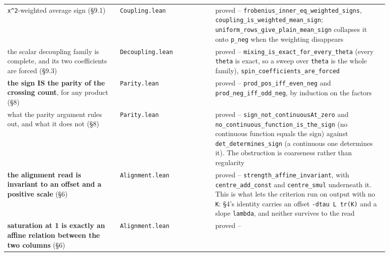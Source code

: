 \documentclass[10pt,letterpaper,twocolumn]{article}
\begin{document}
\begin{center}
{\begin{xtabular}{L{0.264\linewidth}L{0.228\linewidth}L{0.405\linewidth}}
\texttt{\textbar{}\allowbreak{}x\textbar{}\allowbreak{}\^{}2}-weighted
average sign (§9.1) & \texttt{Coupling.\allowbreak{}lean} & proved --
\texttt{frobenius\_\allowbreak{}inner\_\allowbreak{}eq\_\allowbreak{}weighted\_\allowbreak{}signs},
\texttt{coupling\_\allowbreak{}is\_\allowbreak{}weighted\_\allowbreak{}mean\_\allowbreak{}sign};
\texttt{uniform\_\allowbreak{}rows\_\allowbreak{}give\_\allowbreak{}plain\_\allowbreak{}mean\_\allowbreak{}sign}
collapses it onto \texttt{p\_\allowbreak{}neg} when the weighting
disappears \\
the scalar decoupling family is complete, and its two coefficients are
forced (§9.3) & \texttt{Decoupling.\allowbreak{}lean} & proved --
\texttt{mixing\_\allowbreak{}is\_\allowbreak{}exact\_\allowbreak{}for\_\allowbreak{}every\_\allowbreak{}theta}
(every \texttt{theta} is exact, so a sweep over \texttt{theta} is the
whole family),
\texttt{spin\_\allowbreak{}coefficients\_\allowbreak{}are\_\allowbreak{}forced} \\
\textbf{the sign IS the parity of the crossing count}, for any product
(§8) & \texttt{Parity.\allowbreak{}lean} & proved --
\texttt{prod\_\allowbreak{}pos\_\allowbreak{}iff\_\allowbreak{}even\_\allowbreak{}neg}
and
\texttt{prod\_\allowbreak{}neg\_\allowbreak{}iff\_\allowbreak{}odd\_\allowbreak{}neg},
by induction on the factors \\
what the parity argument rules out, and what it does not (§8) & \texttt{Parity.\allowbreak{}lean} & proved --
\texttt{sign\_\allowbreak{}not\_\allowbreak{}continuousAt\_\allowbreak{}zero}
and
\texttt{no\_\allowbreak{}continuous\_\allowbreak{}function\_\allowbreak{}is\_\allowbreak{}the\_\allowbreak{}sign}
(no continuous function equals the sign) against
\texttt{det\_\allowbreak{}determines\_\allowbreak{}sign} (a continuous
one determines it). The obstruction is coarseness rather than regularity \\
\textbf{the alignment read is invariant to an offset and a positive
scale} (§6) & \texttt{Alignment.\allowbreak{}lean} & proved --
\texttt{strength\_\allowbreak{}affine\_\allowbreak{}invariant}, with
\texttt{centre\_\allowbreak{}add\_\allowbreak{}const} and
\texttt{centre\_\allowbreak{}smul} underneath it. This is what lets the
criterion run on output with no \texttt{K}: §4's identity carries an
offset \texttt{-{}\allowbreak{}dtau\ L\ tr(\allowbreak{}K)\allowbreak{}}
and a slope \texttt{lambda}, and neither survives to the read \\
\textbf{saturation at 1 is exactly an affine relation between the two
columns} (§6) & \texttt{Alignment.\allowbreak{}lean} & proved --

\end{xtabular}}
\end{center}
\end{document}
